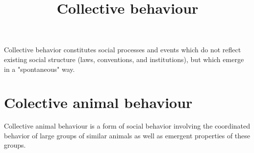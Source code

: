 \documentclass[a4paper]{article}
\title{Collective behaviour}
\date{}
\begin{document}
    \maketitle
    Collective behavior constitutes social processes and events which do not reflect existing social structure (laws, conventions, and institutions), but which emerge in a "spontaneous" way. 
    
    
    \section{Colective animal behaviour}
        Collective animal behaviour is a form of social behavior involving the coordinated behavior of large groups of similar animals as well as emergent properties of these groups.
\end{document}
